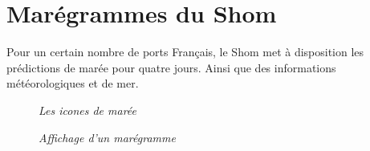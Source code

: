 \section{Marégrammes du Shom}
Pour un certain nombre de ports Français, le Shom met à disposition les prédictions de marée pour quatre jours.
Ainsi que des informations météorologiques et de mer.
\begin{center}
\begin{figure}[ht]
\caption{\label{equiProj}\textit{Les icones de marée}}
\end{figure}
\end{center}
\begin{center}
\begin{figure}[ht]
\caption{\label{equiProj}\textit{Affichage d'un marégramme}}
\end{figure}
\end{center}
